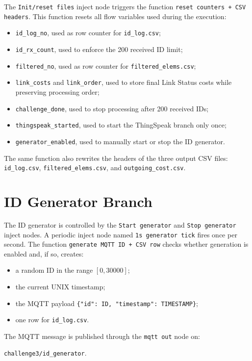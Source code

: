 \documentclass[a4paper,11pt]{article}
\begin{document}
The \texttt{Init/reset files} inject node triggers the function
\texttt{reset counters + CSV headers}. This function resets all flow variables
used during the execution:

\begin{itemize}
    \item \texttt{id\_log\_no}, used as row counter for \texttt{id\_log.csv};
    \item \texttt{id\_rx\_count}, used to enforce the 200 received ID limit;
    \item \texttt{filtered\_no}, used as row counter for
    \texttt{filtered\_elems.csv};
    \item \texttt{link\_costs} and \texttt{link\_order}, used to store final
    Link Status costs while preserving processing order;
    \item \texttt{challenge\_done}, used to stop processing after 200 received
    IDs;
    \item \texttt{thingspeak\_started}, used to start the ThingSpeak branch only
    once;
    \item \texttt{generator\_enabled}, used to manually start or stop the ID
    generator.
\end{itemize}

The same function also rewrites the headers of the three output CSV files:
\texttt{id\_log.csv}, \texttt{filtered\_elems.csv}, and
\texttt{outgoing\_cost.csv}.

\section*{ID Generator Branch}

The ID generator is controlled by the \texttt{Start generator} and
\texttt{Stop generator} inject nodes. A periodic inject node named
\texttt{1s generator tick} fires once per second. The function
\texttt{generate MQTT ID + CSV row} checks whether generation is enabled and,
if so, creates:

\begin{itemize}
    \item a random ID in the range $[0, 30000]$;
    \item the current UNIX timestamp;
    \item the MQTT payload
    \texttt{\{"id": ID, "timestamp": TIMESTAMP\}};
    \item one row for \texttt{id\_log.csv}.
\end{itemize}

The MQTT message is published through the \texttt{mqtt out} node on:
\begin{center}
  \texttt{challenge3/id\_generator}.
\end{center}
\end{document}
